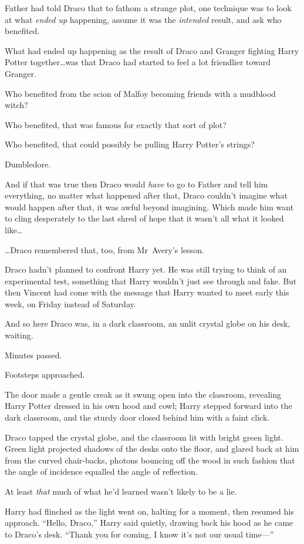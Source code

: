 Father had told Draco that to fathom a strange plot, one technique was to look at what \emph{ended up} happening, assume it was the \emph{intended} result, and ask who benefited.

What had ended up happening as the result of Draco and Granger fighting Harry Potter together…was that Draco had started to feel a lot friendlier toward Granger.

Who benefited from the scion of Malfoy becoming friends with a mudblood witch?

Who benefited, that was famous for exactly that sort of plot?

Who benefited, that could possibly be pulling Harry Potter’s strings?

Dumbledore.

And if that was true then Draco would \emph{have} to go to Father and tell him everything, no matter what happened after that, Draco couldn’t imagine what would happen after that, it was awful beyond imagining. Which made him want to cling desperately to the last shred of hope that it wasn’t all what it looked like…

…Draco remembered that, too, from Mr~Avery’s lesson.

Draco hadn’t planned to confront Harry yet. He was still trying to think of an experimental test, something that Harry wouldn’t just see through and fake. But then Vincent had come with the message that Harry wanted to meet early this week, on Friday instead of Saturday.

And so here Draco was, in a dark classroom, an unlit crystal globe on his desk, waiting.

Minutes passed.

Footsteps approached.

The door made a gentle creak as it swung open into the classroom, revealing Harry Potter dressed in his own hood and cowl; Harry stepped forward into the dark classroom, and the sturdy door closed behind him with a faint click.

Draco tapped the crystal globe, and the classroom lit with bright green light. Green light projected shadows of the desks onto the floor, and glared back at him from the curved chair-backs, photons bouncing off the wood in such fashion that the angle of incidence equalled the angle of reflection.

At least \emph{that} much of what he’d learned wasn’t likely to be a lie.

Harry had flinched as the light went on, halting for a moment, then resumed his approach. “Hello, Draco,” Harry said quietly, drawing back his hood as he came to Draco’s desk. “Thank you for coming, I know it’s not our usual time—”

